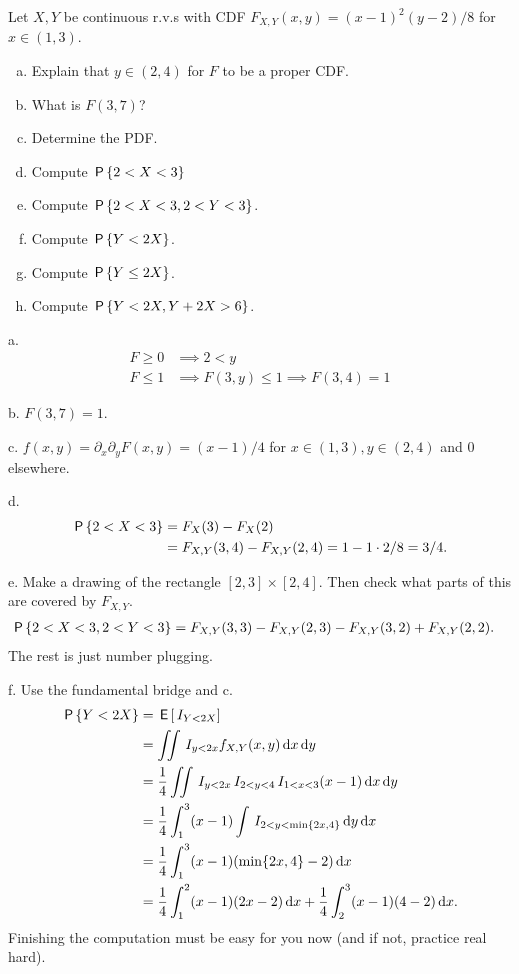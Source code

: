 \documentclass[assignments]{subfiles}
\begin{document}
\begin{exercise}
Let $X, Y$ be continuous r.v.s with CDF $F_{X,Y}(x,y) = (x-1)^{2}(y-2)/8$ for $x \in (1, 3)$.
\begin{enumerate}[a.]
\item Explain that $y\in (2,4)$ for  $F$ to be a proper CDF.
\item What is $F(3,7)$?
\item Determine the PDF.
\item Compute $\P{2< X < 3}$
\item Compute $\P{2< X < 3, 2<Y<3}$.
\item Compute $\P{Y< 2X}$.
\item Compute $\P{Y\leq  2X}$.
\item Compute $\P{Y< 2X, Y+2X > 6}$.
\end{enumerate}
\begin{solution}
a.
\begin{align}
\label{eq:11}
F \geq 0 &\implies 2<y\\
F \leq 1 &\implies F(3, y)\leq 1 \implies F(3,4)=1
\end{align}

b. $F(3,7) = 1$.

c. $f(x,y) = \partial_{x} \partial_{y} F(x,y) = (x-1)/4$ for $x\in(1,3), y\in(2,4)$ and $0$ elsewhere.

d.
\begin{align}
  \label{}
\P{2 < X < 3}
&= F_{X}(3) - F_{X}(2) \\
&= F_{X,Y}(3, 4) - F_{X,Y}(2,4) = 1 - 1\cdot 2/8 = 3/4.
\end{align}

e.
Make a drawing of the rectangle $[2,3]\times[2,4]$. Then check what parts of this are covered by $F_{X,Y}$.
\begin{align}
  \label{}
\P{2 < X < 3, 2 < Y < 3}
&= F_{X,Y}(3, 3) - F_{X,Y}(2,3)  - F_{X,Y}(3, 2) + F_{X,Y}(2,2).
\end{align}
The rest is just number plugging.


f.
Use the fundamental bridge and c.
\begin{align}
\P{Y< 2 X}
&= \E{\1{Y < 2 X}} \\
&= \iint \1{y < 2 x} f_{X,Y}(x,y) \d x \d y\\
&= \frac{1}{4}\iint \1{y < 2 x} \1{2< y <4} \1{1<x<3} (x-1) \d x \d y\\
&= \frac{1}{4}\int_{1}^{3} (x-1) \int \1{2<y < \min\{2 x,4\}}  \d y \d x \\
&= \frac{1}{4}\int_{1}^{3} (x-1) (\min\{2 x,4\}-2) \d x \\
&= \frac{1}{4}\int_{1}^{2} (x-1) (2 x-2) \d x
+ \frac{1}{4}\int_{2}^{3} (x-1) (4-2) \d x.
\end{align}
Finishing the computation must be easy for you now (and if not, practice real hard).


\end{solution}
\end{exercise}
\end{document}
